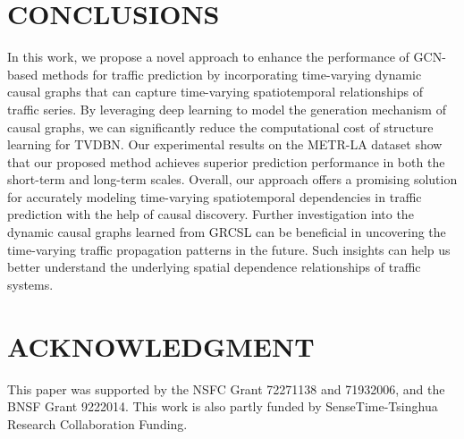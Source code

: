 \documentclass[letterpaper, 10 pt, conference]{ieeeconf}
\begin{document}
\section{CONCLUSIONS}
In this work, we propose a novel approach to enhance the performance of GCN-based methods for traffic prediction by incorporating time-varying dynamic causal graphs that can capture time-varying spatiotemporal relationships of traffic series. By leveraging deep learning to model the generation mechanism of causal graphs, we can significantly reduce the computational cost of structure learning for TVDBN. Our experimental results on the METR-LA dataset show that our proposed method achieves superior prediction performance in both the short-term and long-term scales. Overall, our approach offers a promising solution for accurately modeling time-varying spatiotemporal dependencies in traffic prediction with the help of causal discovery. Further investigation into the dynamic causal graphs learned from GRCSL can be beneficial in uncovering the time-varying traffic propagation patterns in the future. Such insights can help us better understand the underlying spatial dependence relationships of traffic systems.


\addtolength{\textheight}{-5cm}   













\section*{ACKNOWLEDGMENT}

This paper was supported by the NSFC Grant 72271138 and 71932006, and the BNSF Grant 9222014. This work is also partly funded by SenseTime-Tsinghua Research Collaboration Funding. 













\end{document}
